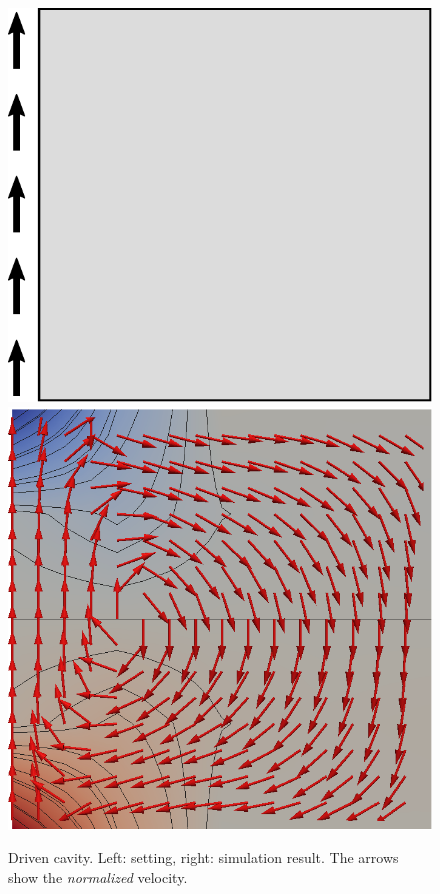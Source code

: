 \documentclass[a4paper,10pt,headings=normal,bibliography=totoc]{scrartcl}
\begin{document}
\begin{figure}
 \begin{center}
  \includegraphics[height=0.3\textheight]{driven_cavity}
  \qquad
  \includegraphics[height=0.3\textheight]{driven_cavity_result}
 \end{center}
 \caption{Driven cavity. Left: setting, right: simulation result.  The arrows show the {\em normalized} velocity.}
 \label{fig:driven_cavity}
\end{figure}
\end{document}
